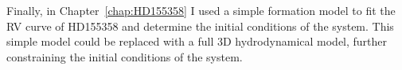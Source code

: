Finally, in Chapter~\ref{chap:HD155358} I used a simple formation model to fit the RV curve of HD155358 and determine the initial conditions of the system. 
This simple model could be replaced with a full 3D hydrodynamical model, further constraining the initial conditions of the system. 

